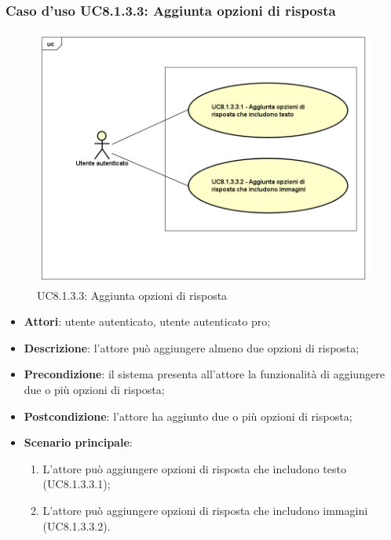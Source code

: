\subsubsection{Caso d'uso UC8.1.3.3: Aggiunta opzioni di risposta}
	\label{UC8.1.3.3}
	\begin{figure}[h]
		\centering
			\includegraphics[scale=0.45,keepaspectratio]{UML/UC8_1_3_3.png}
		\caption{UC8.1.3.3: Aggiunta opzioni di risposta}
	\end{figure}
	\FloatBarrier
	\begin{itemize}
		\item
			\textbf{Attori}: utente autenticato, utente autenticato pro;
		\item		
			\textbf{Descrizione}: l'attore può aggiungere almeno due opzioni di risposta;
		\item
			\textbf{Precondizione}: il sistema presenta all'attore la funzionalità di aggiungere due o più opzioni di risposta; 
		\item
			\textbf{Postcondizione}: l'attore ha aggiunto due o più opzioni di risposta;
		\item
			\textbf{Scenario principale}:
	       		\begin{enumerate}
	       			\item
	       			L'attore può aggiungere opzioni di risposta che includono testo (UC8.1.3.3.1);
					\item
					L'attore può aggiungere opzioni di risposta che includono immagini (UC8.1.3.3.2).
	 			\end{enumerate}
	\end{itemize}	

